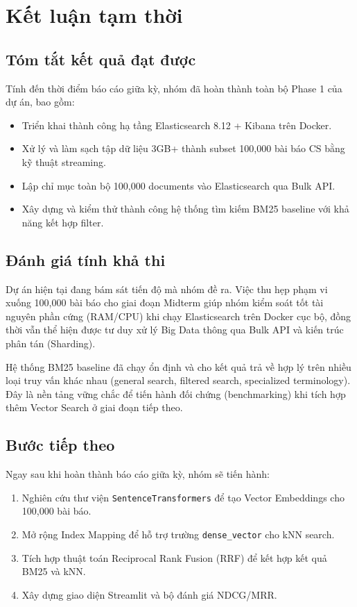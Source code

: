 \chapter{Kết luận tạm thời}

\section{Tóm tắt kết quả đạt được}
Tính đến thời điểm báo cáo giữa kỳ, nhóm đã hoàn thành toàn bộ Phase 1 của dự án, bao gồm:
\begin{itemize}
    \item Triển khai thành công hạ tầng Elasticsearch 8.12 + Kibana trên Docker.
    \item Xử lý và làm sạch tập dữ liệu 3GB+ thành subset 100,000 bài báo CS bằng kỹ thuật streaming.
    \item Lập chỉ mục toàn bộ 100,000 documents vào Elasticsearch qua Bulk API.
    \item Xây dựng và kiểm thử thành công hệ thống tìm kiếm BM25 baseline với khả năng kết hợp filter.
\end{itemize}

\section{Đánh giá tính khả thi}
Dự án hiện tại đang bám sát tiến độ mà nhóm đề ra. Việc thu hẹp phạm vi xuống 100,000 bài báo cho giai đoạn Midterm giúp nhóm kiểm soát tốt tài nguyên phần cứng (RAM/CPU) khi chạy Elasticsearch trên Docker cục bộ, đồng thời vẫn thể hiện được tư duy xử lý Big Data thông qua Bulk API và kiến trúc phân tán (Sharding).

Hệ thống BM25 baseline đã chạy ổn định và cho kết quả trả về hợp lý trên nhiều loại truy vấn khác nhau (general search, filtered search, specialized terminology). Đây là nền tảng vững chắc để tiến hành đối chứng (benchmarking) khi tích hợp thêm Vector Search ở giai đoạn tiếp theo.

\section{Bước tiếp theo}
Ngay sau khi hoàn thành báo cáo giữa kỳ, nhóm sẽ tiến hành:
\begin{enumerate}
    \item Nghiên cứu thư viện \texttt{SentenceTransformers} \cite{reimers2019sentencebert} để tạo Vector Embeddings cho 100,000 bài báo.
    \item Mở rộng Index Mapping để hỗ trợ trường \texttt{dense\_vector} cho kNN search.
    \item Tích hợp thuật toán Reciprocal Rank Fusion (RRF) \cite{cormack2009rrf} để kết hợp kết quả BM25 và kNN.
    \item Xây dựng giao diện Streamlit và bộ đánh giá NDCG/MRR.
\end{enumerate}